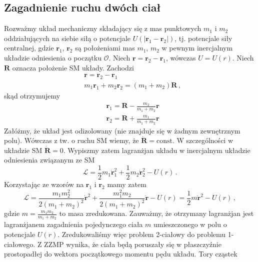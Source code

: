 \documentclass[../main.tex]{subfiles}
\begin{document}
\subsection{Zagadnienie ruchu dwóch ciał}
Rozważmy układ mechaniczny składający się z mas punktowych \(m_1\) i \(m_2\) oddziałujących na
siebie siłą o potencjale \(U(|\mathbf{r}_1-\mathbf{r}_2|)\), tj. potencjale siły centralnej, gdzie
\(\mathbf{r}_1\), \(\mathbf{r}_2\) są położeniami mas \(m_1\), \(m_2\) w pewnym inercjalnym układzie
odniesienia o początku \(\mathcal{O}\). Niech \(\mathbf{r}=\mathbf{r}_2-\mathbf{r}_1\), wówczas
\(U=U(r)\). Niech \(\mathbf{R}\) oznacza położenie SM układy. Zachodzi
\begin{equation*}
\begin{split}
    &\mathbf{r}=\mathbf{r}_2-\mathbf{r}_1\\
    &m_1\mathbf{r}_1+m_2\mathbf{r}_2=(m_1+m_2)\mathbf{R}\,,
\end{split}
\end{equation*}
skąd otrzymujemy
\begin{equation*}
\begin{split}
    &\mathbf{r}_1=\mathbf{R}-\frac{m_2}{m_1+m_2}\mathbf{r}\\
    &\mathbf{r}_2=\mathbf{R}+\frac{m_1}{m_1+m_2}\mathbf{r}
\end{split}
\end{equation*}
Załóżmy, że układ jest odizolowany (nie znajduje się w żadnym zewnętrznym polu). Wówczas z tw. o
ruchu SM wiemy, że \(\dot{\mathbf{R}}=\text{const}\). W szczególności w układzie SM
\(\dot{\mathbf{R}}=0\). Wypiszmy zatem lagranżjan układu w inercjalnym układzie odniesienia
związanym ze SM
\begin{equation*}
    \mathcal{L}=\frac{1}{2}m_1\dot{\mathbf{r}}_1^2+\frac{1}{2}m_2\dot{\mathbf{r}}_2^2-U(r)\,.
\end{equation*}
Korzystając ze wzorów na \(\mathbf{r}_1\) i \(\mathbf{r}_2\) mamy zatem
\begin{equation*}
    \mathcal{L}=\frac{m_1m_2^2}{2(m_1+m_2)^2}\dot{\mathbf{r}}^2+\frac{m_1^2m_2}{2(m_1+m_2)^2}\dot{\mathbf{r}}-U(r)=\frac{1}{2}m\dot{\mathbf{r}}^2-U(r)\,,
\end{equation*}
gdzie \(m=\frac{m_1m_2}{m_1+m_2}\) to masa zredukowana. Zauważmy, że otrzymany lagranżjan jest
lagranżjanem zagadnienia pojedynczego ciała \(m\) umieszczonego w polu o potencjale \(U(r)\).
Zredukowaliśmy więc problem 2-ciałowy do problemu 1-ciałowego. Z ZZMP wynika, że ciała będą
poruszały się w płaszczyźnie prostopadłej do wektora początkowego momentu pędu układu. Tory cząstek
\end{document}
